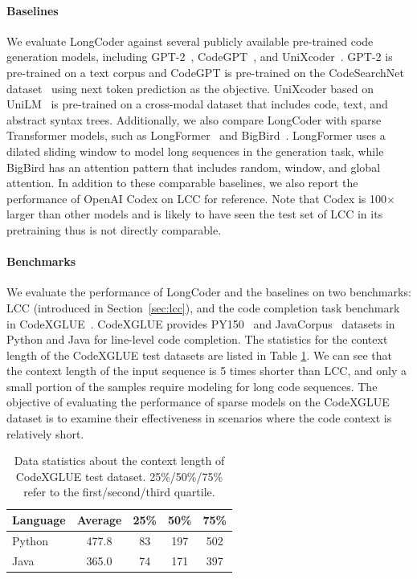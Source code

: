 \documentclass{article}
\begin{document}
\paragraph{Baselines}
We evaluate LongCoder against several publicly available pre-trained %
code generation models, including GPT-2~\cite{radford2019language}, CodeGPT~\cite{lu2021codexglue}, and UniXcoder~\cite{guo2022unixcoder}. GPT-2 is pre-trained on a text corpus and CodeGPT is pre-trained on the CodeSearchNet dataset~\cite{husain2019codesearchnet} using next token prediction as the objective. UniXcoder based on UniLM~\citep{unilm} is pre-trained on a cross-modal dataset that includes code, text, and abstract syntax trees. Additionally, we also compare LongCoder with sparse Transformer models, such as LongFormer~\cite{beltagy2020longformer} and BigBird~\cite{bigbird}. LongFormer uses  a dilated sliding window to model long sequences in the generation task, while BigBird has an attention pattern that includes random, window, and global attention. In addition to these comparable baselines, we also report the performance of OpenAI Codex on LCC for reference. Note that Codex is 100$\times$ larger than other models and is likely to have seen the test set of LCC in its pretraining thus is not directly comparable.
\paragraph{Benchmarks}
We evaluate the performance of LongCoder and the baselines on two benchmarks: LCC (introduced in Section~\ref{sec:lcc}), and the code completion task benchmark in CodeXGLUE~\cite{lu2021codexglue}. CodeXGLUE provides PY150~\cite{raychev2016probabilistic} and JavaCorpus~\cite{allamanis2013mining} datasets in Python and Java for line-level code completion. The statistics for the context length of the CodeXGLUE test datasets are listed in Table \ref{codexglue-sta}. We can see that the context length of the input sequence is 5 times shorter than LCC, and only a small portion of the samples require modeling for long code sequences. The objective of evaluating the performance of sparse models on the CodeXGLUE dataset is to examine their effectiveness in scenarios where the code context is relatively short.
 \begin{table}[t]
\caption{Data statistics about the context length of CodeXGLUE test dataset. 25\%/50\%/75\% refer to the first/second/third quartile.}
\label{codexglue-sta}
\begin{center}
\begin{tabular}{lcccc}
    \toprule
    Language&Average &25\% &50\% &75\% \\
    \midrule
    Python &477.8& 83& 197& 502\\
    Java  &365.0& 74& 171& 397\\
    \bottomrule
\end{tabular}
\end{center}
\end{table}
\end{document}
